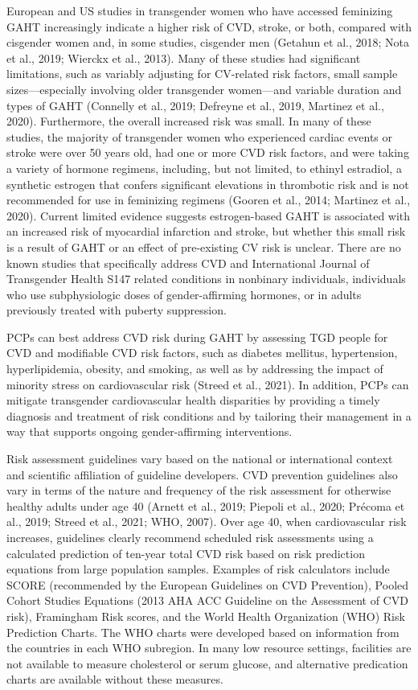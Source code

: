 \documentclass[
]{book}
\begin{document}
European and US studies in transgender
women who have accessed feminizing GAHT
increasingly indicate a higher risk of CVD, stroke,
or both, compared with cisgender women and,
in some studies, cisgender men (Getahun et al.,
2018; Nota et al., 2019; Wierckx et al., 2013).
Many of these studies had significant limitations,
such as variably adjusting for CV-related risk
factors, small sample sizes---especially involving
older transgender women---and variable duration
and types of GAHT (Connelly et al., 2019;
Defreyne et al., 2019, Martinez et al., 2020).
Furthermore, the overall increased risk was small.
In many of these studies, the majority of transgender women who experienced cardiac events
or stroke were over 50 years old, had one or
more CVD risk factors, and were taking a variety
of hormone regimens, including, but not limited,
to ethinyl estradiol, a synthetic estrogen that confers significant elevations in thrombotic risk and
is not recommended for use in feminizing regimens (Gooren et al., 2014; Martinez et al., 2020).
Current limited evidence suggests estrogen-based
GAHT is associated with an increased risk of
myocardial infarction and stroke, but whether
this small risk is a result of GAHT or an effect
of pre-existing CV risk is unclear. There are no
known studies that specifically address CVD and
International Journal of Transgender Health S147
related conditions in nonbinary individuals, individuals who use subphysiologic doses of
gender-affirming hormones, or in adults previously treated with puberty suppression.

PCPs can best address CVD risk during GAHT
by assessing TGD people for CVD and modifiable
CVD risk factors, such as diabetes mellitus, hypertension, hyperlipidemia, obesity, and smoking, as
well as by addressing the impact of minority stress
on cardiovascular risk (Streed et al., 2021). In
addition, PCPs can mitigate transgender cardiovascular health disparities by providing a timely
diagnosis and treatment of risk conditions and by
tailoring their management in a way that supports
ongoing gender-affirming interventions.

Risk assessment guidelines vary based on the
national or international context and scientific
affiliation of guideline developers. CVD prevention guidelines also vary in terms of the nature
and frequency of the risk assessment for otherwise healthy adults under age 40 (Arnett et al.,
2019; Piepoli et al., 2020; Précoma et al., 2019;
Streed et al., 2021; WHO, 2007). Over age 40,
when cardiovascular risk increases, guidelines
clearly recommend scheduled risk assessments
using a calculated prediction of ten-year total
CVD risk based on risk prediction equations
from large population samples. Examples of risk
calculators include SCORE (recommended by the
European Guidelines on CVD Prevention), Pooled
Cohort Studies Equations (2013 AHA ACC
Guideline on the Assessment of CVD risk),
Framingham Risk scores, and the World Health
Organization (WHO) Risk Prediction Charts. The
WHO charts were developed based on information from the countries in each WHO subregion.
In many low resource settings, facilities are not
available to measure cholesterol or serum glucose,
and alternative predication charts are available
without these measures.
\end{document}
